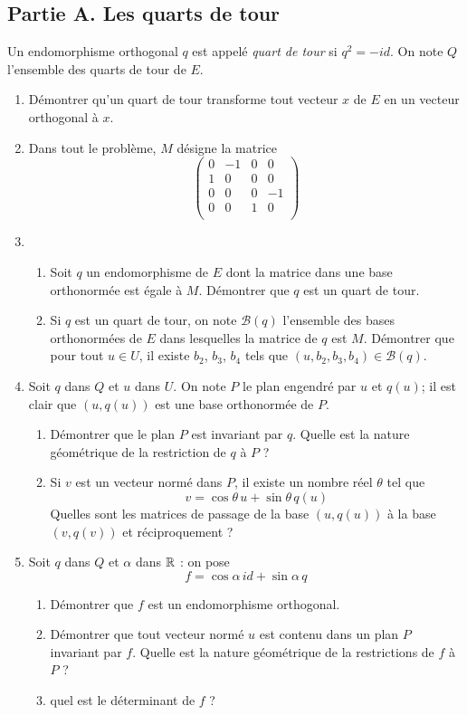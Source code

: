 \subsection*{Partie A. Les quarts de tour}
Un endomorphisme orthogonal $q$ est appelé \emph{quart de tour} si $q^2=-id$. On note $Q$ l'ensemble des quarts de tour de $E$.\begin{enumerate}
\item Démontrer qu'un quart de tour transforme tout vecteur $x$ de $E$ en un vecteur orthogonal à $x$.
\item Dans tout le problème, $M$ désigne la matrice
\[
\begin{pmatrix}
0 & -1 & 0 & 0 \\
1 & 0 & 0 & 0 \\
0 & 0 & 0 & -1 \\
0 & 0 & 1 & 0 \\
\end{pmatrix}
\]
\item\begin{enumerate}
\item Soit $q$ un endomorphisme de $E$ dont la matrice dans une base orthonormée est égale à $M$. Démontrer que $q$ est un quart de tour.
\item Si $q$ est un quart de tour, on note $\mathcal{B}(q)$ l'ensemble des bases orthonormées de $E$ dans lesquelles la matrice de $q$ est $M$. Démontrer que pour tout $u \in U$, il existe $b_2$, $b_3$, $b_4$ tels que $(u,b_2,b_3,b_4)\in \mathcal{B}(q)$.
\end{enumerate}
\item Soit $q$ dans $Q$ et $u$ dans $U$. On note $P$ le plan engendré par $u$ et $q(u)$; il est clair que $(u,q(u))$ est une base orthonormée de $P$.
\begin{enumerate}
\item Démontrer que le plan $P$ est invariant par $q$. Quelle est la nature géométrique de la restriction de $q$ à $P$ ?
\item Si $v$ est un vecteur normé dans $P$, il existe un nombre réel $\theta$ tel que
\[v= \cos \theta \,u + \sin \theta \,q(u)\]
Quelles sont les matrices de passage de la base $(u,q(u))$ à la base $(v,q(v))$ et réciproquement ?
\end{enumerate}
\item Soit $q$ dans $Q$ et $\alpha$ dans $\mathbb{R}$ : on pose
\[f=\cos \alpha \,id + \sin \alpha \,q\]
\begin{enumerate}
\item Démontrer que $f$ est un endomorphisme orthogonal.
\item Démontrer que tout vecteur normé $u$ est contenu dans un plan $P$ invariant par $f$. Quelle est la nature géométrique de la restrictions de $f$ à $P$ ?
\item quel est le déterminant de $f$ ?
\end{enumerate}
\end{enumerate}
